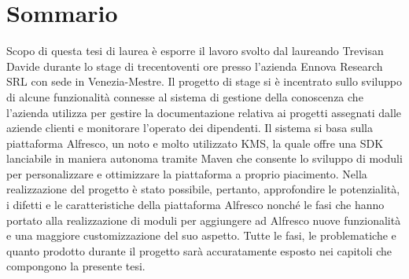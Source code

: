 
\cleardoublepage
{}
{}
\begingroup
\let\clearpage\relax
\let\cleardoublepage\relax
\let\cleardoublepage\relax

\chapter*{Sommario}

Scopo di questa tesi di laurea è esporre il lavoro svolto dal laureando Trevisan Davide
durante lo stage di trecentoventi ore presso l’azienda Ennova Research SRL con sede in
Venezia-Mestre.
Il progetto di stage si è incentrato sullo sviluppo di alcune funzionalità connesse
al sistema di gestione della conoscenza che l’azienda utilizza per gestire la documentazione relativa ai progetti assegnati dalle aziende clienti e monitorare l’operato dei dipendenti. Il sistema si basa sulla piattaforma Alfresco, un noto e molto utilizzato KMS, la quale offre una SDK lanciabile in maniera autonoma tramite Maven che consente lo sviluppo di moduli per personalizzare e ottimizzare la piattaforma a proprio piacimento. Nella realizzazione del progetto è stato possibile, pertanto, approfondire le potenzialità, i difetti e le caratteristiche della piattaforma Alfresco nonché le fasi che hanno portato alla realizzazione di moduli per aggiungere ad Alfresco nuove funzionalità e una maggiore customizzazione del suo aspetto.
Tutte le fasi, le problematiche e quanto prodotto durante il progetto sarà accuratamente esposto nei capitoli che compongono la presente tesi.
%
%

\endgroup			

\vfill

